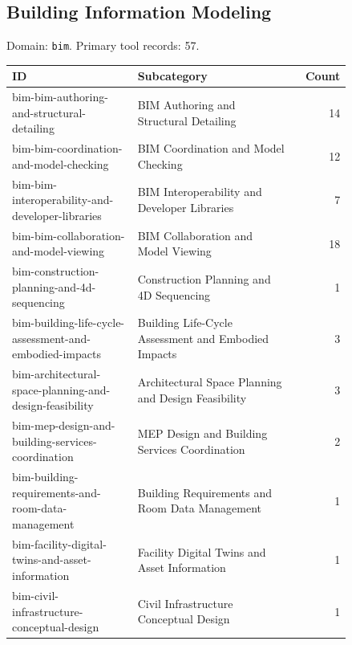 \subsection{Building Information Modeling}
\noindent Domain: \texttt{bim}. Primary tool records: 57.
\begin{longtable}{p{0.37\linewidth}p{0.47\linewidth}r}
ID & Subcategory & Count\\\hline\endhead
bim-bim-authoring-and-structural-detailing & BIM Authoring and Structural Detailing & 14\\
bim-bim-coordination-and-model-checking & BIM Coordination and Model Checking & 12\\
bim-bim-interoperability-and-developer-libraries & BIM Interoperability and Developer Libraries & 7\\
bim-bim-collaboration-and-model-viewing & BIM Collaboration and Model Viewing & 18\\
bim-construction-planning-and-4d-sequencing & Construction Planning and 4D Sequencing & 1\\
bim-building-life-cycle-assessment-and-embodied-impacts & Building Life-Cycle Assessment and Embodied Impacts & 3\\
bim-architectural-space-planning-and-design-feasibility & Architectural Space Planning and Design Feasibility & 3\\
bim-mep-design-and-building-services-coordination & MEP Design and Building Services Coordination & 2\\
bim-building-requirements-and-room-data-management & Building Requirements and Room Data Management & 1\\
bim-facility-digital-twins-and-asset-information & Facility Digital Twins and Asset Information & 1\\
bim-civil-infrastructure-conceptual-design & Civil Infrastructure Conceptual Design & 1\\
\end{longtable}

